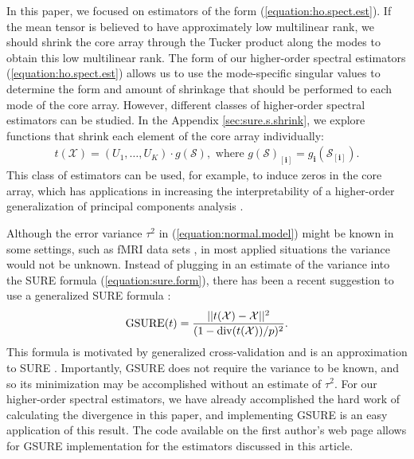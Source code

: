 In this paper, we focused on estimators of the form (\ref{equation:ho.spect.est}). If the mean tensor is believed to have approximately low multilinear rank, we should shrink the core array through the Tucker product along the modes to obtain this low multilinear rank. The form of our higher-order spectral estimators (\ref{equation:ho.spect.est}) allows us to use the mode-specific singular values to determine the form and amount of shrinkage that should be performed to each mode of the core array. However, different classes of higher-order spectral estimators can be studied. In the Appendix \ref{sec:sure.s.shrink}, we explore functions that shrink each element of the core array individually:
\begin{align*}
t(\mathcal{X}) = (U_1,\ldots,U_K)\cdot g(\mathcal{S}), \text{ where } g(\mathcal{S})_{[\mathbf{i}]} = g_{\mathbf{i}}(\mathcal{S}_{[\mathbf{i}]}).
\end{align*}
This class of estimators can be used, for example, to induce zeros in the core array, which has applications in increasing the interpretability of a higher-order generalization of principal components analysis \citep{henrion1993body,kiers1997uniqueness,murakami1998case,andersson1999general,de2001independent,martin2008jacobi}.

Although the error variance $\tau^2$ in (\ref{equation:normal.model}) might be known in some settings, such as fMRI data sets \citep{candes2013unbiased}, in most applied situations the variance would not be unknown. Instead of plugging in an estimate of the variance into the SURE formula (\ref{equation:sure.form}), there has been a recent suggestion to use a generalized SURE formula \citep{sylvain2012smooth,josse2015adaptive}:
\begin{align*}
\operatorname*{GSURE}(t) = \frac{||t(\mathcal{X}) - \mathcal{X}||^2}{(1 - \operatorname*{div}(t(\mathcal{X}))/p)^2}.
\end{align*}
This formula is motivated by generalized cross-validation \citep{golub1979generalized} and is an approximation to SURE \citep{josse2015adaptive}. Importantly, GSURE does not require the variance to be known, and so its minimization may be accomplished without an estimate of $\tau^2$. For our higher-order spectral estimators, we have already accomplished the hard work of calculating the divergence in this paper, and implementing GSURE is an easy application of this result. The code available on the first author's web page allows for GSURE implementation for the estimators discussed in this article.

